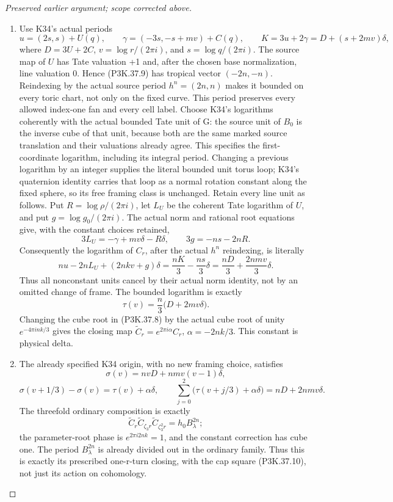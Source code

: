 \begin{proof}[Preserved earlier argument; scope corrected above]
\begin{enumerate}[label=\arabic*.]
\par\medskip\noindent\textbf{5. The cusp charts, cyclic quotient and identical Cox origin.}\enspace

\item Use K34's actual periods
\[
 u=(2s,s)+U(q),\qquad
 \gamma=(-3s,-s+mv)+C(q),\qquad
 K=3u+2\gamma=D+(s+2mv)\delta,
\]
where \(D=3U+2C\), \(v=\log r/(2\pi i)\), and
\(s=\log q/(2\pi i)\). The source map of \(U\) has Tate
valuation +1 and, after the chosen base normalization, line valuation 0.
Hence (P3K.37.9) has tropical vector \((-2n,-n)\). Reindexing by the
actual source period \(h^n=(2n,n)\) makes it bounded on every toric
chart, not only on the fixed curve. This period preserves every allowed
index-one fan and every cell label. Choose K34's logarithms coherently with
the actual bounded Tate unit of G: the source unit of \(B_0\) is the
inverse cube of that unit, because both are the same marked source translation
and their valuations already agree. This specifies the first-coordinate
logarithm, including its integral period. Changing a previous logarithm by an
integer supplies the literal bounded unit torus loop; K34's quaternion
identity carries that loop as a normal rotation constant along the fixed
sphere, so its free framing class is unchanged. Retain every line unit as
follows. Put \(R=\log\rho/(2\pi i)\), let \(L_U\) be the coherent
Tate logarithm of \(U\), and put \(g=\log g_0/(2\pi i)\). The
actual norm and rational root equations give, with the constant choices
retained,
\[
 3L_U=-\gamma+mv\delta-R\delta,\qquad
 3g=-ns-2nR.
\]
Consequently the logarithm of \(C_r\), after the actual \(h^n\)
reindexing, is literally
\[
 nu-2nL_U+(2nkv+g)\delta
   =\frac{nK}{3}-\frac{ns}{3}\delta
   =\frac{nD}{3}+\frac{2nmv}{3}\delta.
\]
Thus all nonconstant units cancel by their actual norm identity, not by an
omitted change of frame. The bounded logarithm is exactly
\[
 \tau(v)=\frac n3\bigl(D+2mv\delta\bigr).                      \tag{P3K.37.12}
\]
Changing the cube root in (P3K.37.8) by the actual cube root of unity
\(e^{-4\pi i nk/3}\) gives the closing map
\(\widetilde C_r=e^{2\pi i\alpha}C_r\),
\(\alpha=-2nk/3\). This constant is physical delta.

\item The already specified K34 origin, with no new framing choice, satisfies
\[
 \sigma(v)=nvD+nmv(v-1)\delta,
\]
\[
 \sigma(v+1/3)-\sigma(v)=\tau(v)+\alpha\delta,
\qquad
 \sum_{j=0}^{2}\bigl(\tau(v+j/3)+\alpha\delta\bigr)
       =nD+2nmv\delta.                                         \tag{P3K.37.13}
\]
The threefold ordinary composition is exactly
\[
 \widetilde C_r\widetilde C_{\zeta_3r}
       \widetilde C_{\zeta_3^2r}
     =h_0 B_\lambda^{2n};                                      \tag{P3K.37.14}
\]
the parameter-root phase is \(e^{2\pi i2nk}=1\), and the constant
correction has cube one. The period \(B_\lambda^{2n}\) is already
divided out in the ordinary family. Thus this is exactly its prescribed
one-r-turn closing, with the cap square (P3K.37.10), not just its action on
cohomology.


\end{enumerate}
\end{proof}
